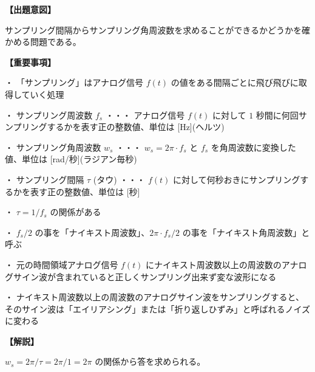 \noindent \textbf{【出題意図】}

\noindent サンプリング間隔からサンプリング角周波数を求めることができるかどうかを確かめる問題である。

\vspace{1em}
\noindent \textbf{【重要事項】}

\medskip
\noindent ・ 「サンプリング」はアナログ信号 $f(t)$ の値をある間隔ごとに飛び飛びに取得していく処理

\medskip
\noindent ・ サンプリング周波数 $f_s$ ・・・ アナログ信号 $f(t)$ に対して $1$ 秒間に何回サンプリングするかを表す正の整数値、単位は [Hz](ヘルツ)

\medskip
\noindent ・ サンプリング角周波数 $w_s$ ・・・ $w_s = 2\pi\cdot f_s$ と $f_s$ を角周波数に変換した値、単位は [rad/秒](ラジアン毎秒)

\medskip
\noindent ・ サンプリング間隔 $\tau$ (タウ) ・・・ $f(t)$ に対して何秒おきにサンプリングするかを表す正の整数値、単位は [秒]

\medskip
\noindent ・ $\tau = 1/f_s$ の関係がある

\medskip
\noindent ・ $f_s/2$ の事を「ナイキスト周波数」、$2\pi \cdot f_s/2$ の事を「ナイキスト角周波数」と呼ぶ

\medskip
\noindent ・ 元の時間領域アナログ信号 $f(t)$ にナイキスト周波数以上の周波数のアナログサイン波が含まれていると正しくサンプリング出来ず変な波形になる

\medskip
\noindent ・ ナイキスト周波数以上の周波数のアナログサイン波をサンプリングすると、そのサイン波は「エイリアシング」または「折り返しひずみ」と呼ばれるノイズに変わる

\vspace{1em}
\noindent \textbf{【解説】}

\noindent $w_s = 2\pi / \tau = 2\pi / 1 = 2\pi$ の関係から答を求められる。
